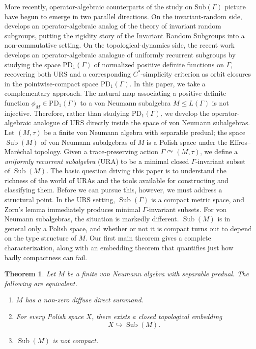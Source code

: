 \documentclass[12pt]{amsart} %
\theoremstyle{plain}
\newtheorem{theoremA}{Theorem}
\theoremstyle{definition}
\DeclareMathOperator{\Sub}{Sub}
\begin{document}
More recently, operator-algebraic counterparts of the study on $\text{Sub}(\Gamma)$ picture have begun to emerge in two parallel directions. On the invariant-random side, \cite{THO25} develops an operator-algebraic analog of the theory of invariant random subgroups, putting the rigidity story of the Invariant Random Subgroups into a non-commutative setting. On the topological-dynamics side, the recent work \cite{AJ} develops an operator-algebraic analogue of uniformly recurrent subgroups by studying the space $\mathrm{PD}_1(\Gamma)$ of normalized positive definite functions on $\Gamma$, recovering both URS and a corresponding $C^*$-simplicity criterion as orbit closures in the pointwise-compact space $\mathrm{PD}_1(\Gamma)$.
In this paper, we take a complementary approach. The natural map associating a positive definite function $\phi_{M} \in \mathrm{PD}_1(\Gamma)$ to a von Neumann subalgebra $M \le L(\Gamma)$ is not injective. Therefore, rather than studying $\mathrm{PD}_1(\Gamma)$, we develop the operator-algebraic analogue of URS directly inside the space of von Neumann subalgebras. Let $(M,\tau)$ be a finite von Neumann algebra with separable predual; the space $\Sub(M)$ of von Neumann subalgebras of $M$ is a Polish space under the Effros--Mar\'echal topology. Given a trace-preserving action $\Gamma \curvearrowright (M,\tau)$, we define a \emph{uniformly recurrent subalgebra} (URA) to be a minimal closed $\Gamma$-invariant subset of $\Sub(M)$.  The basic question driving this paper is to understand the richness of the world of URAs and the tools available for constructing and classifying them.
Before we can pursue this, however, we must address a structural point. In the URS setting, $\Sub(\Gamma)$ is a compact metric space, and Zorn's lemma immediately produces minimal $\Gamma$-invariant subsets. For von Neumann subalgebras, the situation is markedly different. $\Sub(M)$ is in general only a Polish space, and whether or not it is compact turns out to depend on the type structure of $M$. Our first main theorem gives a complete characterization, along with an embedding theorem that quantifies just how badly compactness can fail.
\begin{theoremA}\label{thm:A}
Let $M$ be a finite von Neumann algebra with separable predual. The following are equivalent.
\begin{enumerate}
\item $M$ has a non-zero diffuse direct summand.
\item For every Polish space $X$, there exists a closed topological embedding
$$X \hookrightarrow \Sub(M).$$
\item $\Sub(M)$ is not compact.
\end{enumerate}
\end{theoremA}
\end{document}

